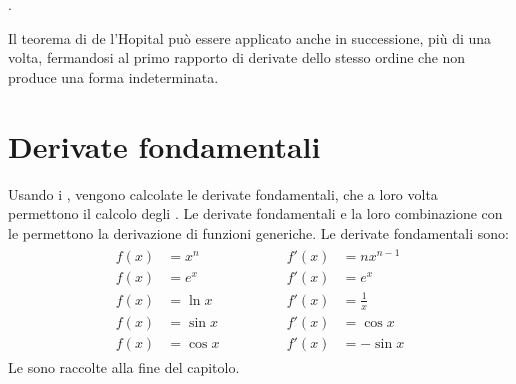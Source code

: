\documentclass[letterpaper,10pt,italian]{jupyterBook}
\begin{document}
\sphinxAtStartPar
{\hyperref[\detokenize{ch/infinitesimal_calculus/derivatives-notes:infinitesimal-calculus-derivatives-thm-hopital-notes}]{}}.

\sphinxAtStartPar
{} Il teorema di de l’Hopital può essere applicato anche in successione, più di una volta, fermandosi al primo rapporto di derivate dello stesso ordine che non produce una forma indeterminata.


\section{Derivate fondamentali}
\label{\detokenize{ch/infinitesimal_calculus/derivatives:derivate-fondamentali}}\label{\detokenize{ch/infinitesimal_calculus/derivatives:infinitesimal-calculus-derivatives-fund}}
\sphinxAtStartPar
Usando i {\hyperref[\detokenize{ch/infinitesimal_calculus/analysis:infinitesimal-calculus-limits-fund}]{}}, vengono calcolate le derivate fondamentali, che a loro volta permettono il calcolo degli {\hyperref[\detokenize{ch/infinitesimal_calculus/integrals:infinitesimal-calculus-integrals-fund}]{}}. Le derivate fondamentali e la loro combinazione con le {\hyperref[\detokenize{ch/infinitesimal_calculus/derivatives:infinitesimal-calculus-derivatives-rules}]{}} permettono la derivazione di funzioni generiche. Le derivate fondamentali sono:
\begin{equation}\label{equation:ch/infinitesimal_calculus/derivatives:eq:infinitesimal-calculus:derivatives:fund}
\begin{split}\begin{aligned}
f(x) & = x^n    \qquad & \qquad f'(x) & = n x^{n-1}   \\ 
f(x) & = e^x    \qquad & \qquad f'(x) & = e^x         \\ 
f(x) & = \ln x  \qquad & \qquad f'(x) & = \frac{1}{x} \\ 
f(x) & = \sin x \qquad & \qquad f'(x) & = \cos x      \\ 
f(x) & = \cos x \qquad & \qquad f'(x) & =-\sin x         
\end{aligned}\end{split}
\end{equation}
\sphinxAtStartPar
Le {\hyperref[\detokenize{ch/infinitesimal_calculus/derivatives-notes:infinitesimal-calculus-derivatives-fund-notes}]{}} sono raccolte alla fine del capitolo.
\end{document}

